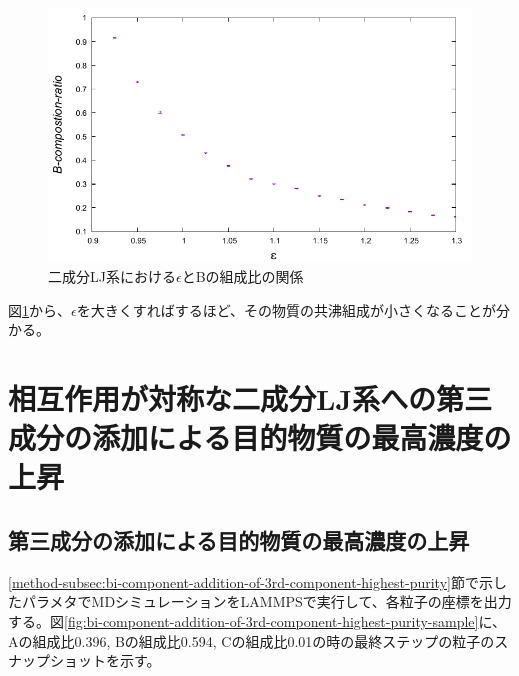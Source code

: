 \documentclass[titlepage]{jsreport}
\begin{document}
\begin{figure}[htbp]
    \begin{center}
        \includegraphics[width=14cm]{fig/epsilon-composition_ratio/epsilon-composition_ratio.pdf}
    \end{center}
    \caption{二成分LJ系における$\epsilon$とBの組成比の関係}
    \label{fig:epsilon-composition_ratio}
\end{figure}

図\ref{fig:epsilon-composition_ratio}から、$\epsilon$を大きくすればするほど、その物質の共沸組成が小さくなることが分かる。


\newpage
\section{相互作用が対称な二成分LJ系への第三成分の添加による目的物質の最高濃度の上昇} \label{results-sec:bi-component-addition-of-3rd-component-highest-purity}
\subsection{第三成分の添加による目的物質の最高濃度の上昇} \label{results-subsec:bi-component-addition-of-3rd-component-highest-purity}
\ref{method-subsec:bi-component-addition-of-3rd-component-highest-purity}節で示したパラメタでMDシミュレーションをLAMMPSで実行して、各粒子の座標を出力する。図\ref{fig:bi-component-addition-of-3rd-component-highest-purity-sample}に、Aの組成比0.396, Bの組成比0.594, Cの組成比0.01の時の最終ステップの粒子のスナップショットを示す。
\end{document}
